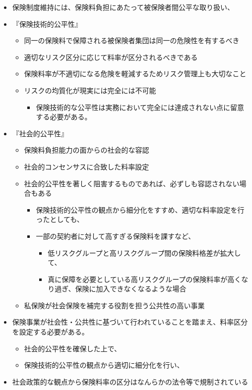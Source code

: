 \documentclass[]{article}
\begin{document}
\begin{itemize}
\tightlist
\item
  保険制度維持には、保険料負担にあたって被保険者間公平な取り扱い、
\item
  『保険技術的公平性』

  \begin{itemize}
  \tightlist
  \item
    同一の保険料で保障される被保険者集団は同一の危険性を有するべき
  \item
    適切なリスク区分に応じて料率が区分されるべきである
  \item
    保険料率が不適切になる危険を軽減するためリスク管理上も大切なこと
  \item
    リスクの均質化が現実には完全には不可能

    \begin{itemize}
    \tightlist
    \item
      保険技術的な公平性は実務において完全には達成されない点に留意する必要がある。
    \end{itemize}
  \end{itemize}
\item
  『社会的公平性』

  \begin{itemize}
  \tightlist
  \item
    保険料負担能力の面からの社会的な容認
  \item
    社会的コンセンサスに合致した料率設定
  \item
    社会的公平性を著しく阻害するものであれば、必ずしも容認されない場合もある

    \begin{itemize}
    \tightlist
    \item
      保険技術的公平性の観点から細分化をすすめ、適切な料率設定を行ったとしても、
    \item
      一部の契約者に対して高すぎる保険料を課すなど、

      \begin{itemize}
      \tightlist
      \item
        低リスクグループと高リスクグループ間の保険料格差が拡大して、
      \item
        真に保障を必要としている高リスクグループの保険料率が高くなり過ぎ、保険に加入できなくなるような場合
      \end{itemize}
    \end{itemize}
  \item
    私保険が社会保険を補完する役割を担う公共性の高い事業
  \end{itemize}
\item
  保険事業が社会性・公共性に基づいて行われていることを踏まえ、料率区分を設定する必要がある。

  \begin{itemize}
  \tightlist
  \item
    社会的公平性を確保した上で、
  \item
    保険技術的公平性の観点から適切に細分化を行い、
  \end{itemize}
\item
  社会政策的な観点から保険料率の区分はなんらかの法令等で規制されている
\end{itemize}
\end{document}
